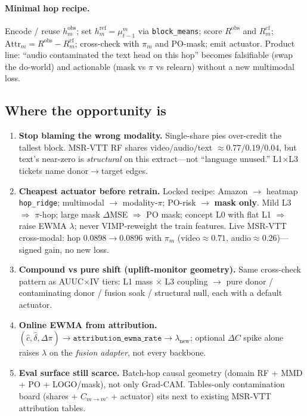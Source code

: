 \paragraph{Minimal hop recipe.}
Encode / reuse $h_m^{\mathrm{obs}}$; set $h_m^{\mathrm{ref}}=\mu_{t-1}^m$ via
\texttt{block\_means}; score $R^{\mathrm{obs}}$ and $R_m^{\mathrm{cf}}$;
$\mathrm{Attr}_m=R^{\mathrm{obs}}-R_m^{\mathrm{cf}}$; cross-check with $\pi_m$
and PO-mask; emit actuator.
Product line: ``audio contaminated the text head on this hop'' becomes
falsifiable (swap the do-world) and actionable (mask vs $\pi$ vs relearn)
without a new multimodal loss.

\subsection{Where the opportunity is}
\begin{enumerate}\itemsep2pt
  \item[\textbf{O1.}] \textbf{Stop blaming the wrong modality.}
        Single-share pies over-credit the tallest block.
        MSR-VTT RF shares video$/\!$audio$/\!$text $\approx 0.77/0.19/0.04$,
        but text's near-zero is \emph{structural} on this extract---not
        ``language unused.''
        L1$\times$L3 tickets name donor$\to$target edges.
  \item[\textbf{O2.}] \textbf{Cheapest actuator before retrain.}
        Locked recipe: Amazon $\to$ heatmap \texttt{hop\_ridge};
        multimodal $\to$ modality-$\pi$;
        PO-risk $\to$ \textbf{mask only}.
        Mild L3 $\Rightarrow$ $\pi$-hop; large mask $\Delta$MSE $\Rightarrow$ PO mask;
        concept L0 with flat L1 $\Rightarrow$ raise EWMA $\lambda$;
        never VIMP-reweight the train features.
        Live MSR-VTT cross-modal: hop $0.0898\to 0.0896$ with $\pi_m$
        (video$\approx 0.71$, audio$\approx 0.26$)---signed gain, no new loss.
  \item[\textbf{O3.}] \textbf{Compound vs pure shift (uplift-monitor geometry).}
        Same cross-check pattern as AUUC$\times$IV tiers:
        L1 mass $\times$ L3 coupling $\to$ pure donor / contaminating donor /
        fusion soak / structural null, each with a default actuator.
  \item[\textbf{O4.}] \textbf{Online EWMA from attribution.}
        $(\hat c,\hat\delta,\Delta\pi)\to\texttt{attribution\_ewma\_rate}\to\lambda_{\mathrm{new}}$;
        optional $\Delta C$ spike alone raises $\lambda$ on the
        \emph{fusion adapter}, not every backbone.
  \item[\textbf{O5.}] \textbf{Eval surface still scarce.}
        Batch-hop causal geometry (domain RF + MMD + PO + LOGO/mask), not
        only Grad-CAM.
        Tables-only contamination board (shares + $C_{m\to m'}$ + actuator)
        sits next to existing MSR-VTT attribution tables.
\end{enumerate}

